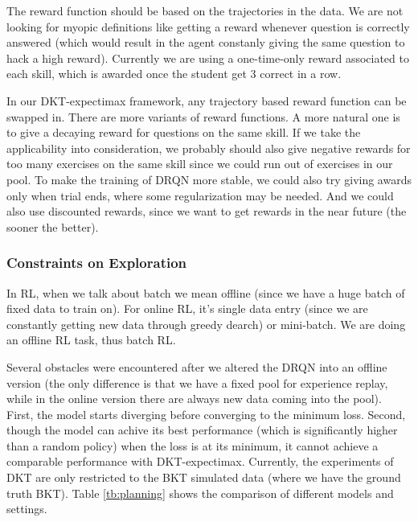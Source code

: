 The reward function should be based on the trajectories in the data. We are not looking for myopic definitions like getting a reward whenever question is correctly answered (which would result in the agent constanly giving the same question to hack a high reward). Currently we are using a one-time-only reward associated to each skill, which is awarded once the student get 3 correct in a row.

In our DKT-expectimax framework, any trajectory based reward function can be swapped in. There are more variants of reward functions. A more natural one is to give a decaying reward for questions on the same skill. If we take the applicability into consideration, we probably should also give negative rewards for too many exercises on the same skill since we could run out of exercises in our pool. To make the training of DRQN more stable, we could also try giving awards only when trial ends, where some regularization may be needed. And we could also use discounted rewards, since we want to get rewards in the near future (the sooner the better).

\subsubsection{Constraints on Exploration}

In RL, when we talk about batch we mean offline (since we have a huge batch of fixed data to train on). For online RL, it’s single data entry (since we are constantly getting new data through greedy dearch) or mini-batch. We are doing an offline RL task, thus batch RL.

Several obstacles were encountered after we altered the DRQN into an offline version (the only difference is that we have a fixed pool for experience replay, while in the online version there are always new data coming into the pool). First, the model starts diverging before converging to the minimum loss. Second, though the model can achive its best performance (which is significantly higher than a random policy) when the loss is at its minimum, it cannot achieve a comparable performance with DKT-expectimax. Currently, the experiments of DKT are only restricted to the BKT simulated data (where we have the ground truth BKT). Table \ref{tb:planning} shows the comparison of different models and settings.

